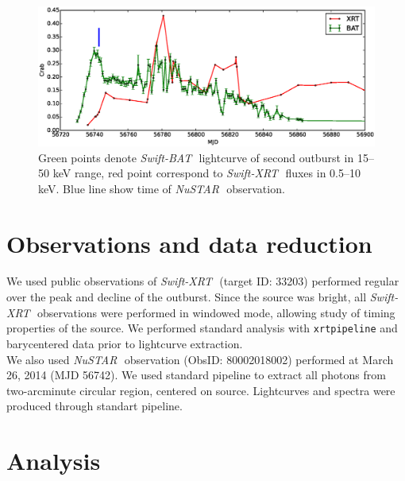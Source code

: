 \documentclass[a4paper,fleqn,usenatbib]{mnras}
\def\swiftx{{\em Swift-XRT\,}}
\def\swiftb{{\em Swift-BAT\,}}
\def\nustar{{\em NuSTAR\,}}
\def\integral{{\em INTEGRAL\,}}
\begin{document}


\begin{figure}
\centerline{\includegraphics[scale=0.5]{batlc_v04.eps}}
\caption{Green points denote \swiftb\, lightcurve of second outburst in 15--50 keV range, red point correspond to \swiftx\, fluxes in 0.5--10 keV. Blue line show time of \nustar\, observation.} 
\label{fig:batlc}
\end{figure} 

\section{Observations and data reduction}
\label{sec:datared} 
We used public observations of \swiftx\, (target ID: 33203) performed regular over the peak and decline of the outburst.  Since the source was bright, all \swiftx\, observations were performed in windowed mode, allowing study of timing properties of the source. We performed standard analysis with {\texttt{xrtpipeline}} and barycentered data prior to lightcurve extraction.\\
We also used \nustar\, observation (ObsID: 80002018002) performed at March 26, 2014 (MJD 56742).  We used standard pipeline to extract all photons from two-arcminute circular region, centered on source. Lightcurves and spectra were produced through standart pipeline.

\section{Analysis}
\end{document}
